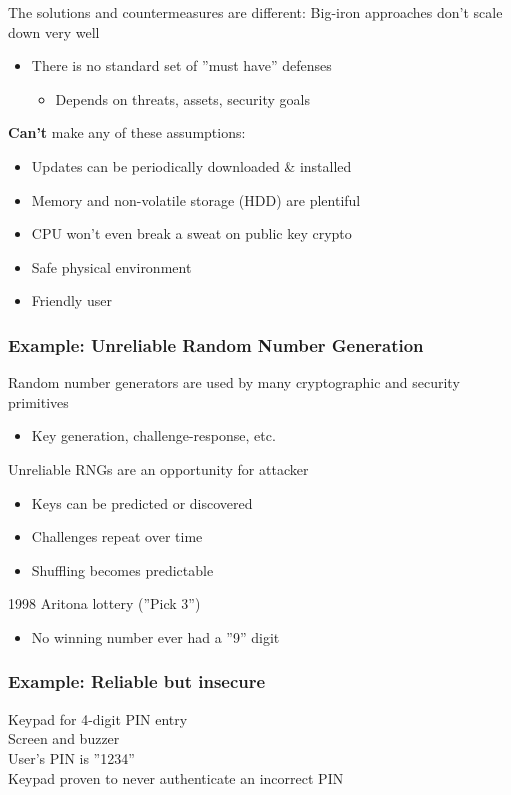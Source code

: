 The solutions and countermeasures are different:
Big-iron approaches don't scale down very well
\begin{itemize}
  \item There is no standard set of ''must have'' defenses
  \begin{itemize}
    \item Depends on threats, assets, security goals
  \end{itemize}
\end{itemize}
\textbf{Can't} make any of these assumptions:
\begin{itemize}
  \item Updates can be periodically downloaded \& installed
  \item Memory and non-volatile storage (HDD) are plentiful
  \item CPU won't even break a sweat on public key crypto
  \item Safe physical environment
  \item Friendly user
\end{itemize}

\subsubsection{Example: Unreliable Random Number Generation}
Random number generators are used by many cryptographic and security primitives
\begin{itemize}
  \item Key generation, challenge-response, etc.
\end{itemize}
Unreliable RNGs are an opportunity for attacker
\begin{itemize}
  \item Keys can be predicted or discovered
  \item Challenges repeat over time
  \item Shuffling becomes predictable
\end{itemize}
1998 Aritona lottery (''Pick 3'')
\begin{itemize}
  \item No winning number ever had a ''9'' digit
\end{itemize}

\subsubsection{Example: Reliable but insecure}
Keypad for 4-digit PIN entry\\
Screen and buzzer\\
User's PIN is ''1234''\\
Keypad proven to never authenticate an incorrect PIN\\


